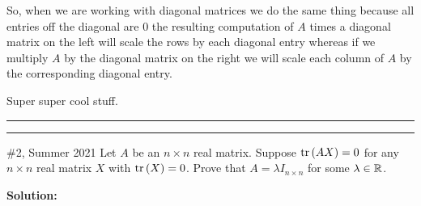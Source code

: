 \documentclass{article}
\begin{document}
So, when we are working with diagonal matrices we do the same thing because all entries off the diagonal are 0 the resulting computation of $A$ times a diagonal matrix on the left will scale the rows by each diagonal entry whereas if we multiply $A$ by the diagonal matrix on the right we will scale each column of $A$ by the corresponding diagonal entry. 

Super super cool stuff.\\

\hrule\vspace{2pt}
\hrule
\break 

\begin{problem}{\#2, Summer 2021} Let $A$ be an $n\times n$ real matrix. Suppose $\text{tr}\left({AX}\right) = 0$ for any $n\times n$ real matrix $X$ with $\text{tr}\left({X}\right) = 0$. Prove that $A = \lambda I_{n\times n}$ for some $\lambda \in \mathbb R$.
\end{problem}

\textbf{Solution:} 
\end{document}
